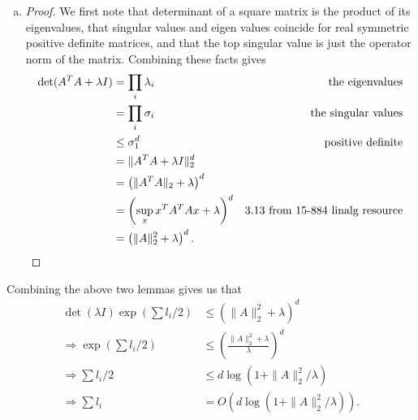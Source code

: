 \documentclass[11pt]{article}
\begin{document}
\begin{enumerate}[1.]
\begin{enumerate}[(a)]
\begin{proof}
\begin{align*}
  &\ge \det (S_i)(1 + l_i)\\
  &\ge \det (S_i) e^{l_i/2}. &\text{By calculus and that }0 < l_i \le 1
\end{align*}
Note that the first equality comes from the observation that for any matrices $A,B$ we have $AB = \sum_k A_{*k} B_{k*}$.
Then we may conclude that 
\begin{align*} 
\det (A^T A + \lambda I) &= \det(S_{n+1})\\
&\ge \det(S_n)e^{l_n/2}\\
&\ge \det(S_1)e^{\sum_1^n l_i/2}\\
&= \det(\lambda I) \exp\left(\sum l_i/2\right). \qedhere 
\end{align*}
\end{proof}
\item \begin{proof}
We first note that determinant of a square matrix is the product of its eigenvalues, that singular values and eigen values coincide for real symmetric positive definite matrices, and that the top singular value is just the operator norm of the matrix. Combining these facts gives 
\begin{align*}
  \det(A^TA + \lambda I) &= \prod_i \lambda_i &\text{the eigenvalues}\\
  &= \prod_i \sigma_i &\text{the singular values}\\
  &\le \sigma_1^{d} &\text{positive definite}\\
  &= \| A^T A + \lambda I\|_2^d\\
  &= \left(\|A^T A\|_2 + \lambda \right)^d\\
  &= \left(\sup_x x^T A^T A x + \lambda \right)^d &\text{3.13 from 15-884 linalg resource}\\
  &= \left(\|A\|_2^2 + \lambda\right)^d. \qedhere 
\end{align*}
\end{proof}
\end{enumerate}
Combining the above two lemmas gives us that
\begin{align*}
\det(\lambda I) \exp(\sum l_i/2) &\le (\|A\|_2^2 + \lambda)^d\\
\Rightarrow \exp(\sum l_i/2) &\le \left(\frac{\|A\|_2^2 + \lambda}{\lambda}\right)^d\\
\Rightarrow \sum l_i/2 &\le d\log(1 + \|A\|_2^2/\lambda)\\
\Rightarrow \sum l_i &= O(d\log(1 + \|A\|_2^2/\lambda)).
\end{align*}
\end{enumerate}
\end{document}

